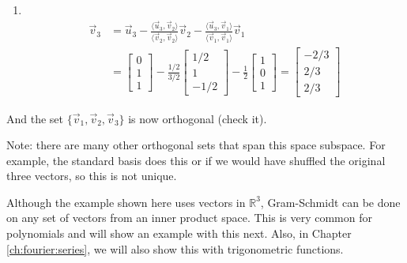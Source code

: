 \begin{example}
\begin{enumerate}
\item  ~
\begin{align*}
\vec{v}_3 & = \vec{u}_3 - \frac{\langle \vec{u}_3, \vec{v}_2 \rangle}{\langle \vec{v}_2, \vec{v}_2 \rangle} \vec{v}_2- \frac{\langle \vec{u}_3, \vec{v}_1 \rangle}{\langle \vec{v}_1, \vec{v}_1 \rangle} \vec{v}_1 \\
& = \begin{bmatrix}
0 \\ 1 \\ 1 
\end{bmatrix} - \frac{1/2}{3/2} \begin{bmatrix}
1/2 \\ 1 \\ -1/2
\end{bmatrix}- \frac{1}{2} \begin{bmatrix}
1 \\ 0 \\ 1
\end{bmatrix} = \begin{bmatrix}
-2/3 \\ 2/3 \\ 2/3
\end{bmatrix}
\end{align*}
\end{enumerate}

And the set $\{\vec{v}_1,\vec{v}_2,\vec{v}_3\}$ is now orthogonal (check it).  

Note: there are many other orthogonal sets that span this space subspace.  For example, the standard basis does this or if we would have shuffled the original three vectors, so this is not unique.  


\end{example}

Although the example shown here uses vectors in $\mathbb{R}^3$, Gram-Schmidt can be done on  any set of vectors from an inner product space.  This is very common for polynomials and will show an example with this next.  Also, in Chapter \ref{ch:fourier:series}, we will also show this with trigonometric functions.  

